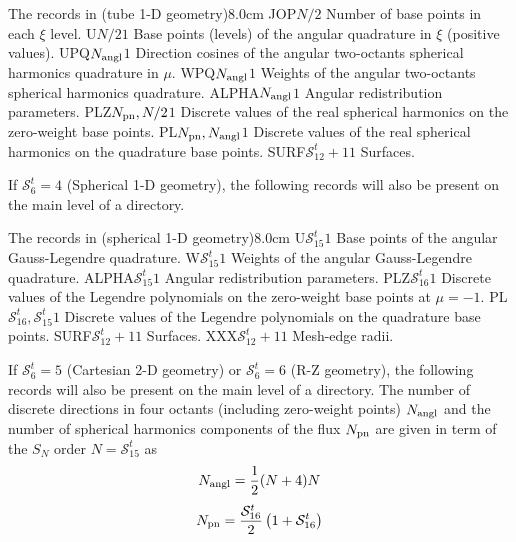 \begin{DescriptionEnregistrement}{The  records in
 (tube 1-D geometry)}{8.0cm}
\IntEnr
  {JOP}{$N/2$}
  {Number of base points in each $\xi$ level.} 
\RealEnr
  {U}{$N/2$}{$1$}
  {Base points (levels) of the angular quadrature in $\xi$ (positive values).} 
\RealEnr
  {UPQ}{$N_{\rm angl}$}{$1$}
  {Direction cosines of the angular two-octants spherical harmonics quadrature in $\mu$.} 
\RealEnr
  {WPQ}{$N_{\rm angl}$}{$1$}
  {Weights of the angular two-octants spherical harmonics quadrature.} 
\RealEnr
  {ALPHA}{$N_{\rm angl}$}{$1$}
  {Angular redistribution parameters.} 
\RealEnr
  {PLZ}{$N_{\rm pn},N/2$}{$1$}
  {Discrete values of the real spherical harmonics on the zero-weight base points.} 
\RealEnr
  {PL}{$N_{\rm pn},N_{\rm angl}$}{$1$}
  {Discrete values of the real spherical harmonics on the quadrature base points.} 
\RealEnr
  {SURF}{$\mathcal{S}^{t}_{12}+1$}{$1$}
  {Surfaces.} 
\end{DescriptionEnregistrement}

If $\mathcal{S}^{t}_{6}=4$ (Spherical 1-D geometry), the following records will also be present on the main level of a 
directory.

\begin{DescriptionEnregistrement}{The  records in
 (spherical 1-D geometry)}{8.0cm}
\RealEnr
  {U}{$\mathcal{S}^{t}_{15}$}{$1$}
  {Base points of the angular Gauss-Legendre quadrature.} 
\RealEnr
  {W}{$\mathcal{S}^{t}_{15}$}{$1$}
  {Weights of the angular Gauss-Legendre quadrature.} 
\RealEnr
  {ALPHA}{$\mathcal{S}^{t}_{15}$}{$1$}
  {Angular redistribution parameters.} 
\RealEnr
  {PLZ}{$\mathcal{S}^{t}_{16}$}{$1$}
  {Discrete values of the Legendre polynomials on the zero-weight base points at $\mu=-1$.} 
\RealEnr
  {PL}{$\mathcal{S}^{t}_{16},\mathcal{S}^{t}_{15}$}{$1$}
  {Discrete values of the Legendre polynomials on the quadrature base points.} 
\RealEnr
  {SURF}{$\mathcal{S}^{t}_{12}+1$}{$1$}
  {Surfaces.} 
\RealEnr
  {XXX}{$\mathcal{S}^{t}_{12}+1$}{$1$}
  {Mesh-edge radii.} 
\end{DescriptionEnregistrement}

If $\mathcal{S}^{t}_{6}=5$ (Cartesian 2-D geometry) or $\mathcal{S}^{t}_{6}=6$ (R-Z geometry), the following records will also be present on the main level of a 
directory. The number of discrete directions in four octants (including zero-weight points) $N_{\rm angl}$ and the number of spherical harmonics components of the flux $N_{\rm pn}$
are given in term of the $S_N$ order $N=\mathcal{S}^{t}_{15}$ as
$$
N_{\rm angl}={1\over 2}(N+4)N
$$
$$
N_{\rm pn}={\mathcal{S}^{t}_{16}\over 2}\left( 1+\mathcal{S}^{t}_{16}\right)
$$

